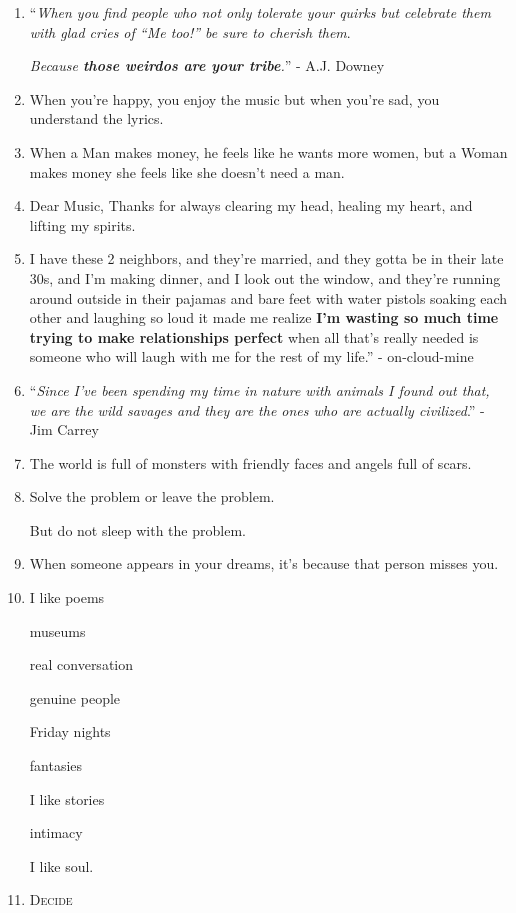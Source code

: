 \documentclass{article}
\numberwithin{equation}{section}
\begin{document}
\begin{enumerate}
    \textit{So stop going to the gym and Go to Work}. - Robert Mugabe (Former PM of Zimbabwe)
    \item ``\textit{When you find people who not only tolerate your quirks but celebrate them with glad cries of ``Me too!'' be sure to cherish them}.
    
    \textit{Because \textbf{those weirdos are your tribe}.}'' - A.J. Downey
    \item When you're happy, you enjoy the music but when you're sad, you understand the lyrics.
    \item When a Man makes money, he feels like he wants more women, but a Woman makes money she feels like she doesn't need a man.
    \item Dear Music, Thanks for always clearing my head, healing my heart, and lifting my spirits.
    \item I have these 2 neighbors, and they're married, and they gotta be in their late 30s, and I'm making dinner, and I look out the window, and they're running around outside in their pajamas and bare feet with water pistols soaking each other and laughing so loud it made me realize \textbf{I'm wasting so much time trying to make relationships perfect} when all that's really needed is someone who will laugh with me for the rest of my life.'' - on-cloud-mine
    \item ``\textit{Since I've been spending my time in nature with animals I found out that, we are the wild savages and they are the ones who are actually civilized}.'' - Jim Carrey
    \item The world is full of monsters with friendly faces and angels full of scars.
    \item Solve the problem or leave the problem.
    
    But do not sleep with the problem.
    \item When someone appears in your dreams, it's because that person misses you.
    \item I like poems
    
    museums
    
    real conversation
    
    genuine people
    
    Friday nights
    
    fantasies
    
    I like stories
    
    intimacy
    
    I like soul.
    \item \textsc{Decide}
    

\end{enumerate}
\end{document}
